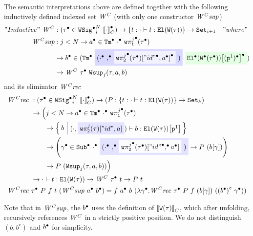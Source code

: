 The semantic interpretations above are defined together with the following inductively defined indexed set $\mathit{W}^C$ (with only one constructor $\mathit{W^Csup}$)
%
\begin{align*}
  "Inductive"~\CWmodel &: (\Glued{\wsig} \in \GWSig{i}{\denotesCC{\cdot}}{N}) \to \{ t : \goodTerm{\cdot}{t}{\El{\wcode{\wsig}}} \} \to \Set{i + 1} \quad "where" \\
    \CWsup &: j < N \to \Glued{a} \in \GTm{\Glued{\cdot}}{\Gwsigproj{j}{1}{\Glued{\wsig}}} \\
    & \to \Glued{b} \in (\GTm{
      \colorbox{blue!15}{(\Glued{\cdot} \Glued{,} 
      \colorbox{blue!5}{\Gsub{\Gwsigproj{j}{2}{\Glued{\wsig}}}{\SubstExt{\GSubstId}{\Glued{a}}}} )} 
      }{
        \colorbox{green!10}{\Gsub{\GEl{\Gwcode{\Glued{\wsig}}}}{\GSubstWeak{1}}}
        }) \\
    & \to \CWmodel~\Glued{\wsig}~\Wsup{j}{\wsig}{a}{b}
\end{align*}
and its eliminator $\mathit{W^Crec}$
\begin{align*}
  \CWrec \  &: (\Glued{\wsig} \in \GWSig{i}{\denotesCC{\cdot}}{N}) \to 
    (P : \{ t : \goodTerm{\cdot}{t}{\El{\wcode{\wsig}}} \} \to \Set{k})  \\
    & \to 
    \Big( j < N \to  \Glued{a} \in \GTm{\Glued{\cdot}}{\Gwsigproj{j}{1}{\Glued{\wsig}}} \\ 
    & \quad \quad \to 
    \setc{b}{\goodTerm{({\cdot} , 
    \colorbox{blue!10}{\sub{\wsigproj{j}{2}{{\wsig}}}{\SubstExt{"id"}{{a}}}}
    ) }{b}{\sub{\El{\wcode{\wsig}}}{\SubstWeak{1}}}} \\ 
    &  \quad \quad \to  
      \left( {\Glued{\gm} \in \GSub{\Glued{\cdot}}{
        \colorbox{blue!11}{(\Glued{\cdot} \Glued{,} 
    \colorbox{blue!1}{\sub{\Gwsigproj{j}{2}{\Glued{\wsig}}}{\GSubstExt{\GSubstId}{\Glued{a}}}} )}}
    }\to P~(\sub{b}{ \gm }) \right) \\
    & \quad \quad \to P~(\Wsup{j}{\wsig}{a}{b}) \Big) \\
    & \to \goodTerm{\cdot}{t}{\El{\wcode{\wsig}}} \to \CWmodel~\Glued{\wsig}~t \to P~t \\
  \CWrec \  & \Glued{\wsig}~P~f~t~(\CWsup~\Glued{a}~\Glued{b}) = f~\Glued{a}~b~(\lambda \Glued{\gm}. \CWrec~\Glued{\wsig}~P~f~(\sub{b}{\gm})~(\Gmodel{\Glued{b}}~\Glued{\gm}))
\end{align*}

Note that in $\mathit{W^Csup}$, the ${b}^\bullet$ uses the definition of
${\llbracket {\ensuremath{\texttt{W}({\tau})}} \rrbracket}_C$, which after unfolding, recursively references $\mathit{W}^C$
in a strictly positive position. %
We do not distinguish $(b, b^c)$ and ${b}^\bullet$ for simplicity. 

